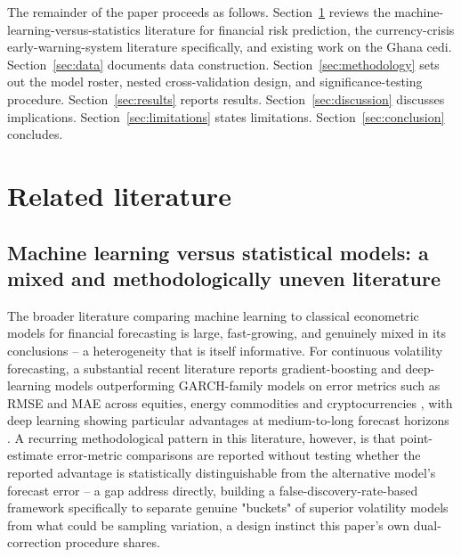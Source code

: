 \documentclass[final,3p,times,authoryear]{elsarticle}
\begin{document}
The remainder of the paper proceeds as follows. Section~\ref{sec:lit}
reviews the machine-learning-versus-statistics literature for financial
risk prediction, the currency-crisis early-warning-system literature
specifically, and existing work on the Ghana cedi.
Section~\ref{sec:data} documents data construction.
Section~\ref{sec:methodology} sets out the model roster, nested
cross-validation design, and significance-testing procedure.
Section~\ref{sec:results} reports results. Section~\ref{sec:discussion}
discusses implications. Section~\ref{sec:limitations} states
limitations. Section~\ref{sec:conclusion} concludes.

\section{Related literature}
\label{sec:lit}

\subsection{Machine learning versus statistical models: a mixed and
methodologically uneven literature}

The broader literature comparing machine learning to classical
econometric models for financial forecasting is large, fast-growing, and
genuinely mixed in its conclusions -- a heterogeneity that is itself
informative. For continuous volatility forecasting, a substantial recent
literature reports gradient-boosting and deep-learning models
outperforming GARCH-family models on error metrics such as RMSE and MAE
across equities, energy commodities and cryptocurrencies
\citep{energyvol2025,componentgarch2024,cryptovol2025}, with deep
learning showing particular advantages at medium-to-long forecast
horizons \citep{structuralbreaks2025}. A recurring methodological pattern
in this literature, however, is that point-estimate error-metric
comparisons are reported without testing whether the reported advantage
is statistically distinguishable from the alternative model's forecast
error -- a gap \citet{hassanniakalager2024} address directly, building
a false-discovery-rate-based framework specifically to separate genuine
"buckets" of superior volatility models from what could be sampling
variation, a design instinct this paper's own dual-correction procedure
shares.
\end{document}

